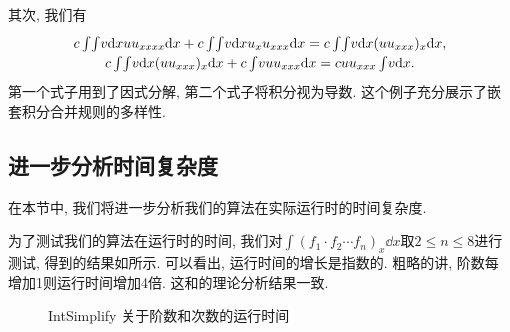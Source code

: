 其次, 我们有 
\begin{equation}
\def\arraystretch{1.2}
\begin{array}{c}
c\int\!{\int\!{v\dd x}uu_{xxxx}\dd x}+c\int\!{\int\!{v\dd x}u_xu_{xxx}\dd x}=c\int\!{\int\!{v\dd x}(uu_{xxx})_x\dd x},\\
c\int\!{\int\!{v\dd x}(uu_{xxx})_x\dd x}+c\int\!{vuu_{xxx}\dd x}=cuu_{xxx}\int\!{v\dd x}.
\end{array}
\end{equation} 
第一个式子用到了因式分解, 第二个式子将积分视为导数. 这个例子充分展示了嵌套积分合并规则的多样性. 

\subsection{进一步分析时间复杂度}\label{sec5.2-03}
在本节中, 我们将进一步分析我们的算法在实际运行时的时间复杂度. 

为了测试我们的算法在运行时的时间, 我们对$\int\!{(f_1\cdot f_2\cdots f_n)_x \dd x}$取$2\le n \le 8$进行测试, 得到的结果如所示. 可以看出, 运行时间的增长是指数的. 粗略的讲, 阶数每增加1则运行时间增加4倍. 这和的理论分析结果一致. 

\begin{figure}[htb]
\centering
{}
\caption{IntSimplify 关于阶数和次数的运行时间}
\end{figure}

